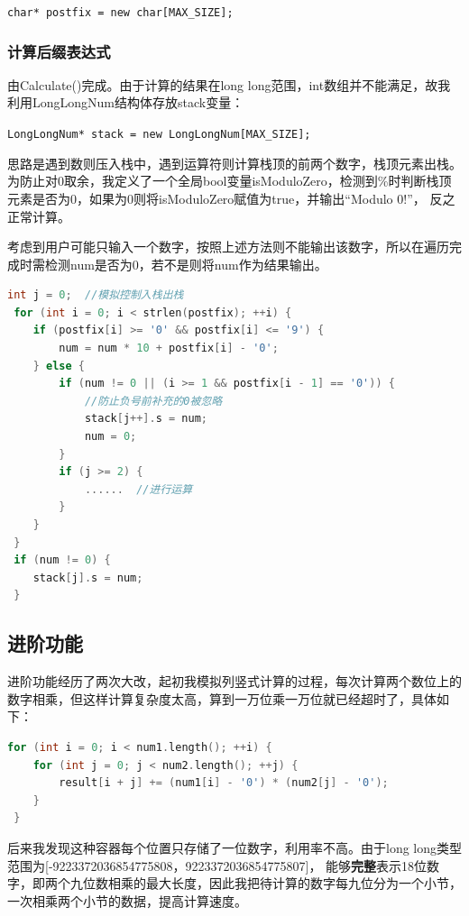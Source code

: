 \documentclass[a4paper, 11pt, UTF8]{ctexart}
\begin{document}
\verb|char* postfix = new char[MAX_SIZE];|

\subsubsection{计算后缀表达式}

由Calculate()完成。由于计算的结果在long long范围，int数组并不能满足，故我利用LongLongNum结构体存放stack变量：

\verb|LongLongNum* stack = new LongLongNum[MAX_SIZE];|

思路是遇到数则压入栈中，遇到运算符则计算栈顶的前两个数字，栈顶元素出栈。
为防止对0取余，我定义了一个全局bool变量isModuloZero，检测到\%时判断栈顶元素是否为0，如果为0则将isModuloZero赋值为true，并输出“Modulo 0!”，
反之正常计算。

考虑到用户可能只输入一个数字，按照上述方法则不能输出该数字，所以在遍历完成时需检测num是否为0，若不是则将num作为结果输出。

\begin{lstlisting}[language=C++, basicstyle=\ttfamily]
 int j = 0;  //模拟控制入栈出栈
 for (int i = 0; i < strlen(postfix); ++i) {
    if (postfix[i] >= '0' && postfix[i] <= '9') {
        num = num * 10 + postfix[i] - '0';
    } else {
        if (num != 0 || (i >= 1 && postfix[i - 1] == '0')) {
            //防止负号前补充的0被忽略
            stack[j++].s = num;
            num = 0;
        }
        if (j >= 2) {
            ......  //进行运算
        }
    }
 }
 if (num != 0) {
    stack[j].s = num;
 }
\end{lstlisting}

\subsection{进阶功能}

进阶功能经历了两次大改，起初我模拟列竖式计算的过程，每次计算两个数位上的数字相乘，但这样计算复杂度太高，算到一万位乘一万位就已经超时了，具体如下：

\begin{lstlisting}[language=C++, basicstyle=\ttfamily]
 for (int i = 0; i < num1.length(); ++i) {
    for (int j = 0; j < num2.length(); ++j) {
        result[i + j] += (num1[i] - '0') * (num2[j] - '0');
    }
 }
\end{lstlisting}

后来我发现这种容器每个位置只存储了一位数字，利用率不高。由于long long类型范围为[-9223372036854775808，9223372036854775807]，
能够\textbf{完整}表示18位数字，即两个九位数相乘的最大长度，因此我把待计算的数字每九位分为一个小节，一次相乘两个小节的数据，提高计算速度。
\end{document}
